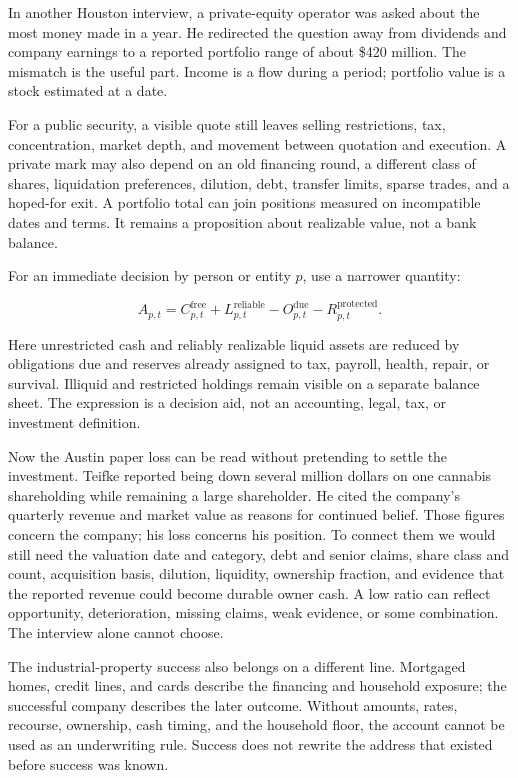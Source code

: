 In another Houston interview, a private-equity operator was asked about the most
money made in a year. He redirected the question away from dividends and company
earnings to a reported portfolio range of about \$420 million. The mismatch is
the useful part. Income is a flow during a period; portfolio value is a stock
estimated at a date.

For a public security, a visible quote still leaves selling restrictions, tax,
concentration, market depth, and movement between quotation and execution. A
private mark may also depend on an old financing round, a different class of
shares, liquidation preferences, dilution, debt, transfer limits, sparse trades,
and a hoped-for exit. A portfolio total can join positions measured on
incompatible dates and terms. It remains a proposition about realizable value,
not a bank balance.

For an immediate decision by person or entity \(p\), use a narrower quantity:

\begin{equation}
A_{p,t}=C^{\mathrm{free}}_{p,t}+L^{\mathrm{reliable}}_{p,t}
       -O^{\mathrm{due}}_{p,t}-R^{\mathrm{protected}}_{p,t}.
\end{equation}

Here unrestricted cash and reliably realizable liquid assets are reduced by
obligations due and reserves already assigned to tax, payroll, health, repair,
or survival. Illiquid and restricted holdings remain visible on a separate
balance sheet. The expression is a decision aid, not an accounting, legal, tax,
or investment definition.

Now the Austin paper loss can be read without pretending to settle the
investment. Teifke reported being down several million dollars on one cannabis
shareholding while remaining a large shareholder. He cited the company's
quarterly revenue and market value as reasons for continued belief. Those
figures concern the company; his loss concerns his position. To connect them we
would still need the valuation date and category, debt and senior claims, share
class and count, acquisition basis, dilution, liquidity, ownership fraction,
and evidence that the reported revenue could become durable owner cash. A low
ratio can reflect opportunity, deterioration, missing claims, weak evidence, or
some combination. The interview alone cannot choose.

The industrial-property success also belongs on a different line. Mortgaged
homes, credit lines, and cards describe the financing and household exposure;
the successful company describes the later outcome. Without amounts, rates,
recourse, ownership, cash timing, and the household floor, the account cannot be
used as an underwriting rule. Success does not rewrite the address that existed
before success was known.

